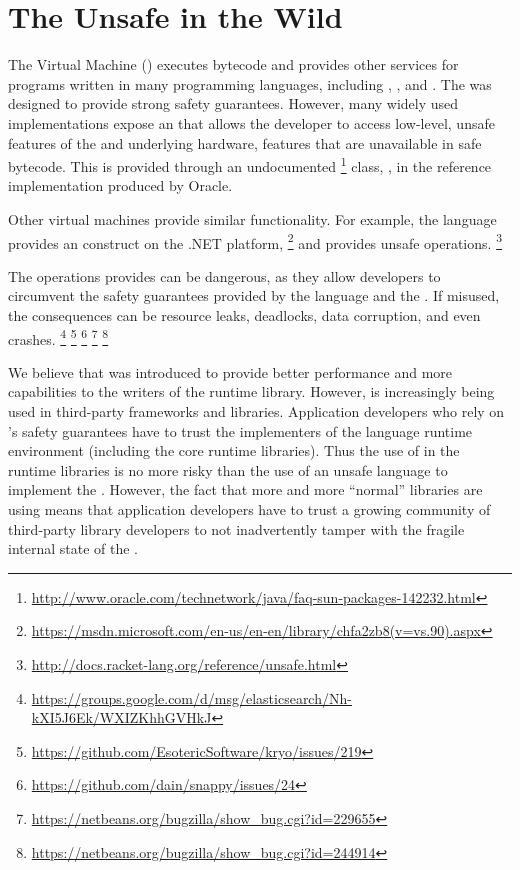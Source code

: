 

\chapter{The \java{} Unsafe \api{} in the Wild}
\label{cha:unsafe}

The \java{} Virtual Machine (\jvm{}) executes \java{} bytecode and
provides other services for programs written in
many programming languages, including \java{}, \scala{}, and \clojure{}.
The \jvm{} was designed to provide strong safety guarantees.
However, many widely used \jvm{} implementations expose an \api{} that
allows the developer to access low-level,
unsafe features of the \jvm{} and underlying hardware,
features that are unavailable in safe \java{} bytecode.
This \api{} is provided through an undocumented%
\footnote{\url{http://www.oracle.com/technetwork/java/faq-sun-packages-142232.html}}
class, \smu{}, in the \java{} reference implementation produced by Oracle.

Other virtual machines provide similar functionality.
For example, the \csharp{} language provides an  construct
on the .NET platform,%
\footnote{\url{https://msdn.microsoft.com/en-us/en-en/library/chfa2zb8(v=vs.90).aspx}}
and \racket{} provides unsafe operations.%
\footnote{\url{http://docs.racket-lang.org/reference/unsafe.html}}

The operations \smu{} provides can be dangerous,
as they allow developers to circumvent the safety guarantees provided by
the \java{} language and the \jvm{}.
If misused, the consequences can be resource leaks, deadlocks,
data corruption, and even \jvm{} crashes.%
\footnote{\url{https://groups.google.com/d/msg/elasticsearch/Nh-kXI5J6Ek/WXIZKhhGVHkJ}}
\footnote{\url{https://github.com/EsotericSoftware/kryo/issues/219}}
\footnote{\url{https://github.com/dain/snappy/issues/24}}
\footnote{\url{https://netbeans.org/bugzilla/show_bug.cgi?id=229655}}
\footnote{\url{https://netbeans.org/bugzilla/show_bug.cgi?id=244914}}

We believe that \smu{} was introduced to provide better performance and
more capabilities to the writers of the \java{} runtime library.
However, \smu{} is increasingly being used in third-party
frameworks and libraries.
Application developers who rely on \java{}'s safety guarantees have to
trust the implementers of the language runtime environment
(including the core runtime libraries).
Thus the use of \smu{} in the runtime libraries is no more risky than
the use of an unsafe language to implement the \jvm{}.
However, the fact that more and more ``normal'' libraries are using
\smu{} means that application developers have to trust a growing
community of third-party \java{} library developers to not
inadvertently tamper with the fragile internal state of the \jvm{}.


